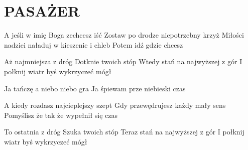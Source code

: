 \documentclass[../../../songbook.tex]{subfiles}
\begin{document}
\TabPositions{8cm} %
\section*{PASAŻER}
{}
\vspace{0.5cm}
A jeśli w imię Boga zechcesz iść			  \newline	
Zostaw po drodze niepotrzebny krzyż			 \newline	
Miłości nadziei naładuj w kieszenie i chleb \newline	
Potem idź gdzie chcesz						 \newline	

Aż najmniejsza z dróg			 \newline
Dotknie twoich stóp \newline
Wtedy stań na najwyższej z gór \newline
I połknij wiatr byś wykrzyczeć mógł \newline

\-\hspace{1cm} Ja tańczę a niebo niebo gra \newline
\-\hspace{1cm} Ja śpiewam prze niebieski czas \newline

A kiedy rozdasz najcieplejszy szept			\newline	
Gdy przewędrujesz każdy mały sens			\newline	
Pomyślisz że tak że wypełnił się czas			\newline	

To ostatnia z dróg			\newline	
Szuka twoich stóp			\newline	
Teraz stań na najwyższej z gór			\newline	
I połknij wiatr byś wykrzyczeć mógł			\newline	
\end{document}

